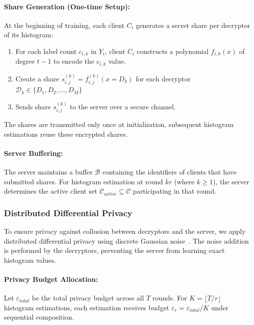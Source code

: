 \documentclass[runningheads]{llncs}
\begin{document}
\paragraph{Share Generation (One-time Setup):} At the beginning of training, each client $C_i$ generates a secret share per decryptor of its histogram:
\begin{enumerate}
    \item For each label count $c_{i,k}$ in  $Y_i$, client $C_i$ constructs a polynomial $f_{i,k}(x)$ of degree $t-1$ to encode the $c_{i,k}$ value.
    \item Create a share $s_{i,j}^{(k)} = f_{i,j}^{(k)}(x = {D}_k)$ for each decryptor $\mathcal{D}_k \in\{D_1, D_2, \ldots, D_M\}$
    \item Sends share $s_{i,j}^{(k)}$ to the server over a secure channel.
\end{enumerate}

The shares are transmitted only once at initialization, subsequent histogram estimations reuse these encrypted shares.

\paragraph{Server Buffering:} The server maintains a buffer $\mathcal{B}$ containing the identifiers of clients that have submitted shares. For histogram estimation at round $kr$ (where $k \geq 1$), the server determines the active client set $\mathcal{C}_{active} \subseteq \mathcal{C}$ participating in that round.

\subsubsection{Distributed Differential Privacy}

To ensure privacy against collusion between decryptors and the server, we apply distributed differential privacy using discrete Gaussian noise~\cite{kairouz2021distributed}. The noise addition is performed by the decryptors, preventing the server from learning exact histogram values.

\paragraph{Privacy Budget Allocation:} Let $\varepsilon_{total}$ be the total privacy budget across all $T$ rounds. For $K = \lfloor T/r \rfloor$ histogram estimations, each estimation receives budget $\varepsilon_r = \varepsilon_{total}/K$ under sequential composition.
\end{document}
